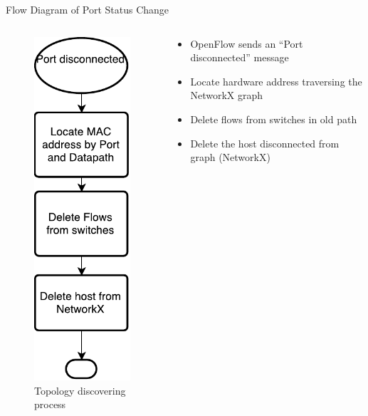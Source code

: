 \documentclass{beamer}
\begin{document}
\begin{frame}{Flow Diagram of Port Status Change}
  \begin{columns}
    \begin{column}{0.5\linewidth}
      \begin{figure}
	    \includegraphics[scale=0.45]{images/algorithm2.pdf}
	    \caption{Topology discovering process}
	  \end{figure}
    \end{column}
    \begin{column}{0.5\linewidth}
      \begin{itemize}
      \item OpenFlow sends an ``Port disconnected'' message
      \item Locate hardware address traversing the NetworkX graph
      \item Delete flows from switches in old path
      \item Delete the host disconnected from graph (NetworkX)
      \end{itemize}
    \end{column}    
  \end{columns}
\end{frame}
\end{document}
